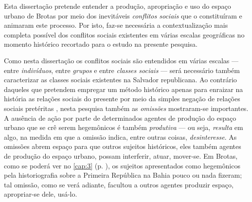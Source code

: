 
Esta dissertação pretende entender a produção, apropriação e uso do espaço urbano de Brotas por meio dos inevitáveis \textit{conflitos sociais} que o constituíram e animaram este processo. Por isto, faz-se necessária a contextualização mais completa possível dos conflitos sociais existentes em várias escalas geográficas no momento histórico recortado para o estudo na presente pesquisa. 

Como nesta dissertação os conflitos sociais são entendidos em várias escalas --- entre \textit{indivíduos}, entre \textit{grupos} e entre \textit{classes sociais} --- será necessário também caracterizar as classes sociais existentes na Salvador republicana. Ao contrário daqueles que pretendem empregar um método histórico apenas para enraizar na história as relações sociais do presente por meio da simples negação de relações sociais pretéritas \cite{machado_harxhist_2018}, nesta pesquisa também as \textit{omissões} mostraram-se importantes. A ausência de ação por parte de determinados agentes de produção do espaço urbano que se crê serem hegemônicos é também \textit{produtiva} --- ou seja, \textit{resulta} em algo, na medida em que a omissão indica, entre outras coisas, \textit{desinteresse}. As omissões abrem espaço para que outros sujeitos históricos, eles também agentes de produção do espaço urbano, possam interferir, atuar, mover-se. Em Brotas, como se poderá ver no \autoref{cap:3} (p. \pageref{cap:3}), os sujeitos apresentados como hegemônicos pela historiografia sobre a Primeira República na Bahia pouco ou nada fizeram; tal omissão, como se verá adiante, facultou a outros agentes produzir espaço, apropriar-se dele, usá-lo.






% 